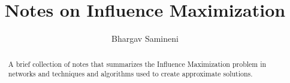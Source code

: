 \documentclass[11pt]{article}
\title{Notes on Influence Maximization}
\author{Bhargav Samineni}
\date{}
\begin{document}
    \maketitle
    \begin{abstract}
        A brief collection of notes that summarizes the \textsf{Influence Maximization} problem in networks 
        and techniques and algorithms used to create approximate solutions. 
    \end{abstract}
    
    
    
    

    \newpage
    \appendix
    

    \newpage
    \printbibliography
\end{document}
